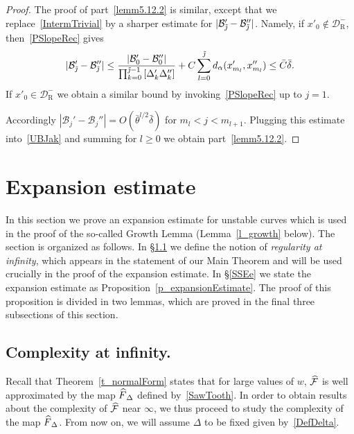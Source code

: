 \documentclass[10pt]{amsart}
\theoremstyle{definition}\newtheorem{defi}[theo]{Definition}\newtheorem{rema}[theo]{Remark}\newtheorem{exam}[theo]{Example}\newtheorem{exem}[theo]{Example}\newtheorem{nota}[theo]{Notation}
\newcommand{\nin}{\not\in}
\newcommand{\cB}{\mathcal{B}}
\newcommand{\pslope}{\mathcal{B}}
\newcommand{\cm}{\mathcal{F}}
\newcommand{\cell}{\mathcal{D}}
\newcommand{\cmp}{\hat\cm}
\newcommand{\brC}{\bar{C}}
\newcommand{\brdelta}{\bar{\delta}}
\newcommand{\recoPrivate}{\mathrm{R}}
\newcommand{\reco}{{\cell^-_{\recoPrivate}}}
\newcommand{\ppPrivate}[2]{#1^{#2}}
\newcommand{\prePrivate}[1]{\ppPrivate{#1}{-}}
\newcommand{\prpslope}{\prePrivate{\pslope}}
\newcommand{\nf}{\hat F}
\newcommand{\tj}{\tilde{\jmath}}
\renewcommand{\prpslope}{\cB}
\renewcommand{\prpslope}{\cB}
\renewcommand{\prpslope}{\cB}
\let\oldtilde\tilde
\renewcommand*{\tilde}[1]{\mathchoice{\widetilde{#1}}{\widetilde{#1}}{\oldtilde{#1}}{\oldtilde{#1}}}
\let\oldhat\hat
\renewcommand*{\hat}[1]{\mathchoice{\widehat{#1}}{\widehat{#1}}{\oldhat{#1}}{\oldhat{#1}}}
\begin{document}
\begin{proof}
The proof of part~\eqref{lemm5.12.2} is similar, except that we replace~\eqref{IntermTrivial} by a sharper estimate for $|\prpslope_{\tj}'-\prpslope_{\tj}''|$. Namely, if $x'_0\nin\reco$, then~\eqref{PSlopeRec} gives
\begin{equation*}
|\prpslope_{\tj}'-\prpslope_{\tj}''|
\leq \frac{\left|\cB_{0}'-\cB_{0}''\right|}{\prod_{k=0}^{\tj-1} \left[\Delta_k' \Delta_k''\right]} +C \sum_{l=0}^{\tj} d_\alpha (x_{m_l}', x_{m_l}'') \leq \brC\brdelta.
\end{equation*}
If $x'_0\in\reco$ we obtain a similar bound by invoking~\eqref{PSlopeRec} up to $j = 1$.

Accordingly $|\prpslope_{j}'-\prpslope_{j}''|=O(\bar\theta^{l/2}\brdelta)$ for $m_l < j < m_{l+1}$. Plugging this estimate into~\eqref{UBJak} and summing for $l\geq 0$ we obtain part~\eqref{lemm5.12.2}.
\end{proof}

\section{Expansion estimate}\label{sec:expansion-estimate}
In this section we prove an expansion estimate for unstable curves which is used in the proof of the so-called Growth Lemma (Lemma~\ref{l_growth} below). The section is organized as follows. In
\S\ref{SS-VirtualComplexity} we define the notion of
\emph{regularity at infinity}, which appears in the statement of our Main Theorem and will be used crucially in the proof of the expansion estimate. In \S\ref{SSEe} we state the expansion estimate as Proposition~\ref{p_expansionEstimate}. The proof of this proposition is divided in two lemmas, which are proved in the final three subsections of this section.

\subsection{Complexity at infinity.} \label{SS-VirtualComplexity}
Recall that Theorem~\ref{t_normalForm} states that for large values of $w$, $\cmp$ is well approximated by the map $\nf_\Delta$ defined by~\eqref{SawTooth}. In order to obtain results about the complexity of $\cmp$ near $\infty$, we thus proceed to study the complexity of the map $\nf_\Delta$. From now on, we will assume $\Delta$ to be fixed given by~\eqref{DefDelta}.
\end{document}
